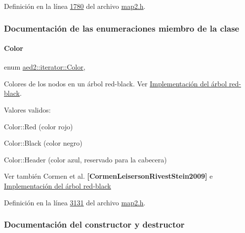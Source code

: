 Definición en la línea \hyperlink{map2_8h_source_l01780}{1780} del archivo \hyperlink{map2_8h_source}{map2.\+h}.



\subsubsection{Documentación de las enumeraciones miembro de la clase}
\mbox{\label{classaed2_1_1iterator_aaa188f82ba585d8de525b1400242cf4f_aaa188f82ba585d8de525b1400242cf4f}} 
\paragraph{\texorpdfstring{Color}{Color}}
{\footnotesize\ttfamily enum \hyperlink{classaed2_1_1iterator_aaa188f82ba585d8de525b1400242cf4f_aaa188f82ba585d8de525b1400242cf4f}{aed2\+::iterator\+::\+Color}\hspace{0.3cm}{\ttfamily [strong]}, {\ttfamily [private]}}



Colores de los nodos en un árbol red-\/black. Ver \hyperlink{Implementacion}{Implementación del árbol red-\/black}. 

Valores validos\+: \begin{DoxyItemize}
\item Color\+::\+Red (color rojo) \item Color\+::\+Black (color negro) \item Color\+::\+Header (color azul, reservado para la cabecera)\end{DoxyItemize}
\begin{DoxySeeAlso}{Ver también}
Cormen et al. {\bfseries [Cormen\+Leiserson\+Rivest\+Stein2009]} e \hyperlink{Implementacion}{Implementación del árbol red-\/black} 
\end{DoxySeeAlso}


Definición en la línea \hyperlink{map2_8h_source_l03131}{3131} del archivo \hyperlink{map2_8h_source}{map2.\+h}.



\subsubsection{Documentación del constructor y destructor}
\mbox{\label{classaed2_1_1iterator_a769d0ae1a1c7ed66acdd321e44fcd0e1_a769d0ae1a1c7ed66acdd321e44fcd0e1}} 
